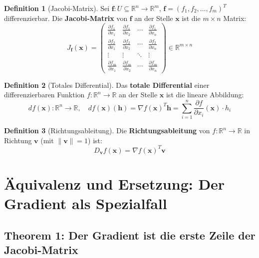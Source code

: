 ﻿\documentclass[a4paper,12pt]{article}
\theoremstyle{definition}
\newtheorem{definition}{Definition}
\begin{document}
\begin{definition}[Jacobi-Matrix]
	Sei $\boldsymbol{f}: U \subseteq \mathbb{R}^n \to \mathbb{R}^m$, $\boldsymbol{f} = (f_1, f_2, \ldots, f_m)^T$ differenzierbar. Die \textbf{Jacobi-Matrix} von $\boldsymbol{f}$ an der Stelle $\boldsymbol{x}$ ist die $m \times n$ Matrix:
	\[
	J_{\boldsymbol{f}}(\boldsymbol{x}) = \begin{pmatrix}
		\frac{\partial f_1}{\partial x_1} & \frac{\partial f_1}{\partial x_2} & \cdots & \frac{\partial f_1}{\partial x_n} \\
		\frac{\partial f_2}{\partial x_1} & \frac{\partial f_2}{\partial x_2} & \cdots & \frac{\partial f_2}{\partial x_n} \\
		\vdots & \vdots & \ddots & \vdots \\
		\frac{\partial f_m}{\partial x_1} & \frac{\partial f_m}{\partial x_2} & \cdots & \frac{\partial f_m}{\partial x_n}
	\end{pmatrix} \in \mathbb{R}^{m \times n}
	\]
\end{definition}

\begin{definition}[Totales Differential]
	Das \textbf{totale Differential} einer differenzierbaren Funktion $f: \mathbb{R}^n \to \mathbb{R}$ an der Stelle $\boldsymbol{x}$ ist die lineare Abbildung:
	\[
	df(\boldsymbol{x}): \mathbb{R}^n \to \mathbb{R}, \quad df(\boldsymbol{x})(\boldsymbol{h}) = \nabla f(\boldsymbol{x})^T \boldsymbol{h} = \sum_{i=1}^n \frac{\partial f}{\partial x_i}(\boldsymbol{x}) \cdot h_i
	\]
\end{definition}

\begin{definition}[Richtungsableitung]
	Die \textbf{Richtungsableitung} von $f: \mathbb{R}^n \to \mathbb{R}$ in Richtung $\boldsymbol{v}$ (mit $\|\boldsymbol{v}\| = 1$) ist:
	\[
	D_{\boldsymbol{v}} f(\boldsymbol{x}) = \nabla f(\boldsymbol{x})^T \boldsymbol{v}
	\]
\end{definition}

\section{Äquivalenz und Ersetzung: Der Gradient als Spezialfall}

\subsection{Theorem 1: Der Gradient ist die erste Zeile der Jacobi-Matrix}
\end{document}
